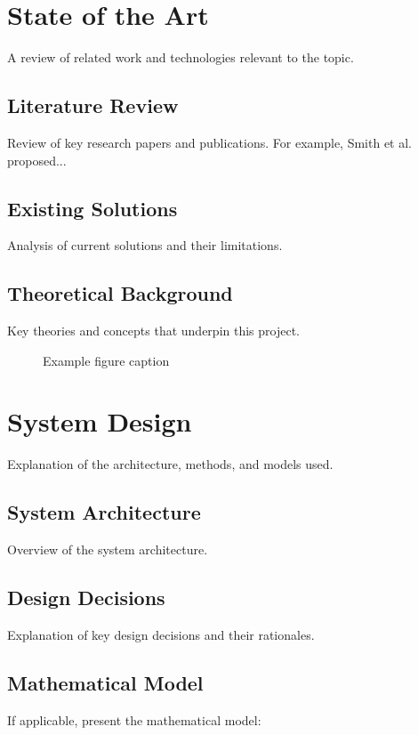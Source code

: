 \documentclass[12pt,a4paper]{report}
\begin{document}
\chapter{State of the Art}

A review of related work and technologies relevant to the topic.

\section{Literature Review}
Review of key research papers and publications. For example, Smith et al. \cite{example} proposed...

\section{Existing Solutions}
Analysis of current solutions and their limitations.

\section{Theoretical Background}
Key theories and concepts that underpin this project.

\begin{figure}[htbp]
    \centering
    \framebox{\rule{0cm}{5cm}\rule{10cm}{0cm}}
    \caption{Example figure caption}
    \label{fig:example}
\end{figure}

\chapter{System Design}

Explanation of the architecture, methods, and models used.

\section{System Architecture}
Overview of the system architecture.

\section{Design Decisions}
Explanation of key design decisions and their rationales.

\section{Mathematical Model}
If applicable, present the mathematical model:
\end{document}
